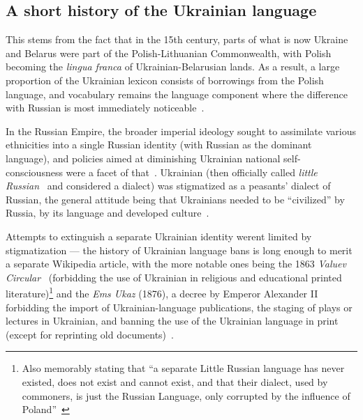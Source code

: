 \subsection{A short history of the Ukrainian language}
\label{sec:ukr-lang-history}
This stems from the fact that in the 15th century, parts of what is now
Ukraine and Belarus were part of the Polish-Lithuanian Commonwealth,
with Polish becoming the \emph{lingua franca} of Ukrainian-Belarusian
lands.
As a result, a large proportion of the Ukrainian lexicon consists of
borrowings from the Polish language, and vocabulary remains the
language component where the difference with Russian is most
immediately noticeable~\cite{press2015ukrainian}.

In the Russian Empire, the broader imperial ideology sought to
assimilate various ethnicities into a single Russian identity (with
Russian as the dominant language), and policies aimed at diminishing
Ukrainian national self-consciousness were a facet of
that~\cite{doi:10.1016/j.euras.2014.05.005}.
Ukrainian (then officially called \emph{little Russian}~\cite{press2015ukrainian} and considered a dialect) was
 stigmatized as a peasants' dialect of Russian,
the general attitude being that
Ukrainians needed to be ``civilized'' by Russia, by its
language and developed culture~\cite{doi:10.1016/j.euras.2014.05.005}.

Attempts to extinguish a separate Ukrainian identity
weren\textquotesingle t limited by stigmatization --- the history of
Ukrainian language bans is long enough to merit a separate Wikipedia
article, with the more notable ones
being the 1863 \emph{Valuev Circular}~\cite{dibrova2017valuev}
(forbidding the use of Ukrainian in religious and educational printed
literature)\footnote{Also memorably stating that ``a separate Little
  Russian language has never existed, does not exist and cannot exist,
  and that their dialect, used by commoners, is just the Russian
  Language, only corrupted by the influence of
  Poland''~\cite{enwikisource:13111073}}
   and the \emph{Ems
Ukaz} (1876), a decree by Emperor Alexander II 
forbidding the import of Ukrainian-language publications,
the staging of plays or lectures in Ukrainian,
and banning the use of the Ukrainian
language in print (except for reprinting old documents)~\cite{remy2017despite}.


